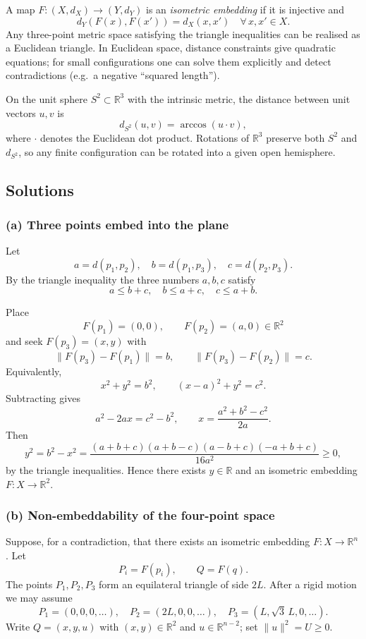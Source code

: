 \documentclass[12pt,a4paper]{article}
\theoremstyle{plain}
\theoremstyle{definition}      %
\begin{document}
	A map $F:(X,d_X)\to(Y,d_Y)$ is an \emph{isometric embedding} if it is
	injective and
	\[
	d_Y(F(x),F(x'))=d_X(x,x')\quad\forall\,x,x'\in X.
	\]
	Any three-point metric space satisfying the triangle inequalities can be
	realised as a Euclidean triangle.  In Euclidean space, distance constraints
	give quadratic equations; for small configurations one can solve them
	explicitly and detect contradictions (e.g.\ a negative ``squared length'').
	
	On the unit sphere $S^2\subset\mathbb{R}^3$ with the intrinsic metric,
	the distance between unit vectors $u,v$ is
	\[
	d_{S^2}(u,v)=\arccos(u\cdot v),
	\]
	where $\cdot$ denotes the Euclidean dot product.  Rotations of $\mathbb{R}^3$
	preserve both $S^2$ and $d_{S^2}$, so any finite configuration can be rotated
	into a given open hemisphere.
	
	\subsection*{Solutions}
	
	\subsubsection*{(a) Three points embed into the plane}
	
	Let
	\[
	a=d(p_1,p_2),\quad b=d(p_1,p_3),\quad c=d(p_2,p_3).
	\]
	By the triangle inequality the three numbers $a,b,c$ satisfy
	\[
	a\le b+c,\quad b\le a+c,\quad c\le a+b.
	\]
	
	Place
	\[
	F(p_1)=(0,0),\qquad F(p_2)=(a,0)\in\mathbb{R}^2
	\]
	and seek $F(p_3)=(x,y)$ with
	\[
	\|F(p_3)-F(p_1)\|=b,\qquad \|F(p_3)-F(p_2)\|=c.
	\]
	Equivalently,
	\[
	x^2+y^2=b^2,\qquad (x-a)^2+y^2=c^2.
	\]
	Subtracting gives
	\[
	a^2-2ax=c^2-b^2,\qquad
	x=\frac{a^2+b^2-c^2}{2a}.
	\]
	Then
	\[
	y^2=b^2-x^2
	=\frac{(a+b+c)(a+b-c)(a-b+c)(-a+b+c)}{16a^2}\ge 0,
	\]
	by the triangle inequalities.  Hence there exists $y\in\mathbb{R}$ and an
	isometric embedding $F:X\to\mathbb{R}^2$.
	
	\subsubsection*{(b) Non-embeddability of the four-point space}
	
	Suppose, for a contradiction, that there exists an isometric embedding
	$F:X\to\mathbb{R}^n$.  Let
	\[
	P_i=F(p_i),\qquad Q=F(q).
	\]
	The points $P_1,P_2,P_3$ form an equilateral triangle of side $2L$.  After a
	rigid motion we may assume
	\[
	P_1=(0,0,0,\dots),\quad
	P_2=(2L,0,0,\dots),\quad
	P_3=(L,\sqrt{3}\,L,0,\dots).
	\]
	Write $Q=(x,y,u)$ with $(x,y)\in\mathbb{R}^2$ and $u\in\mathbb{R}^{n-2}$; set
	$\|u\|^2=U\ge0$.
	
\end{document}
